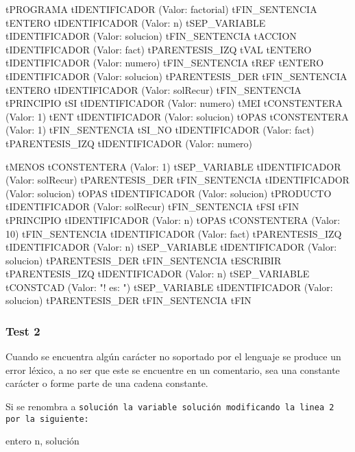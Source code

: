 \noindent\begin{minipage}{.45\textwidth}
\begin{codigo}
tPROGRAMA
tIDENTIFICADOR (Valor: factorial)
tFIN_SENTENCIA
tENTERO
tIDENTIFICADOR (Valor: n)
tSEP_VARIABLE
tIDENTIFICADOR (Valor: solucion)
tFIN_SENTENCIA
tACCION
tIDENTIFICADOR (Valor: fact)
tPARENTESIS_IZQ
tVAL
tENTERO
tIDENTIFICADOR (Valor: numero)
tFIN_SENTENCIA
tREF
tENTERO
tIDENTIFICADOR (Valor: solucion)
tPARENTESIS_DER
tFIN_SENTENCIA
tENTERO
tIDENTIFICADOR (Valor: solRecur)
tFIN_SENTENCIA
tPRINCIPIO
tSI
tIDENTIFICADOR (Valor: numero)
tMEI
tCONSTENTERA (Valor: 1)
tENT
tIDENTIFICADOR (Valor: solucion)
tOPAS
tCONSTENTERA (Valor: 1)
tFIN_SENTENCIA
tSI_NO
tIDENTIFICADOR (Valor: fact)
tPARENTESIS_IZQ
tIDENTIFICADOR (Valor: numero)
\end{codigo}
\end{minipage}\hfill
\begin{minipage}{.45\textwidth}
\begin{codigo}
tMENOS
tCONSTENTERA (Valor: 1)
tSEP_VARIABLE
tIDENTIFICADOR (Valor: solRecur)
tPARENTESIS_DER
tFIN_SENTENCIA
tIDENTIFICADOR (Valor: solucion)
tOPAS
tIDENTIFICADOR (Valor: solucion)
tPRODUCTO
tIDENTIFICADOR (Valor: solRecur)
tFIN_SENTENCIA
tFSI
tFIN
tPRINCIPIO
tIDENTIFICADOR (Valor: n)
tOPAS
tCONSTENTERA (Valor: 10)
tFIN_SENTENCIA
tIDENTIFICADOR (Valor: fact)
tPARENTESIS_IZQ
tIDENTIFICADOR (Valor: n)
tSEP_VARIABLE
tIDENTIFICADOR (Valor: solucion)
tPARENTESIS_DER
tFIN_SENTENCIA
tESCRIBIR
tPARENTESIS_IZQ
tIDENTIFICADOR (Valor: n)
tSEP_VARIABLE
tCONSTCAD (Valor: "! es: ")
tSEP_VARIABLE
tIDENTIFICADOR (Valor: solucion)
tPARENTESIS_DER
tFIN_SENTENCIA
tFIN
\end{codigo}
\end{minipage}

\begin{codigo}
\end{codigo}

\subsubsection{Test 2}
Cuando se encuentra algún carácter no soportado por el lenguaje se produce un error léxico, a no ser que este se encuentre en un comentario, sea una constante carácter o forme parte de una cadena constante.

Si se renombra a \tt{solución} la variable \tt{solución} modificando la linea 2 por la siguiente:

\begin{codigo}[style=minileng]
entero n, solución
\end{codigo}

